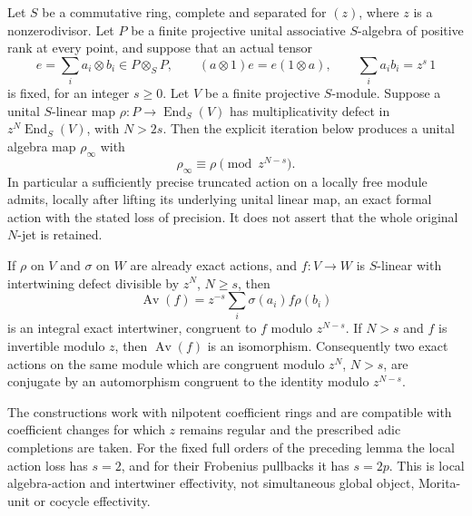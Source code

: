 \begin{proposition}
\label{D:scaled-separable-action-Newton}
Let $S$ be a commutative ring, complete and separated for $(z)$,
where $z$ is a nonzerodivisor. Let $P$ be a finite projective
unital associative $S$-algebra of positive rank at every point,
and suppose that an actual tensor
\[
 e=\sum_i a_i\otimes b_i\in P\otimes_S P,
 \qquad (a\otimes1)e=e(1\otimes a),\qquad
                       \sum_i a_i b_i=z^s\,1            \tag{D.SN.7}
\]
is fixed, for an integer $s\ge0$. Let $V$ be a finite projective
$S$-module. Suppose a unital $S$-linear map
$\rho:P\to\operatorname{End}_S(V)$ has multiplicativity defect
in $z^N\operatorname{End}_S(V)$, with $N>2s$.
Then the explicit iteration below produces a unital algebra
map $\rho_\infty$ with
\[
                \rho_\infty\equiv\rho\pmod {z^{N-s}}.
                                                        \tag{D.SN.8}
\]
In particular a sufficiently precise truncated action on a
locally free module admits, locally after lifting its underlying
unital linear map, an exact formal action with the stated loss
of precision. It does not assert that the whole original
$N$-jet is retained.

If $\rho$ on $V$ and $\sigma$ on $W$ are already exact actions,
and $f:V\to W$ is $S$-linear with intertwining defect divisible
by $z^N$, $N\ge s$, then
\[
 \operatorname{Av}(f)=z^{-s}\sum_i\sigma(a_i)f\rho(b_i)
                                                        \tag{D.SN.9}
\]
is an integral exact intertwiner, congruent to $f$ modulo
$z^{N-s}$. If $N>s$ and $f$ is invertible modulo $z$, then
$\operatorname{Av}(f)$ is an isomorphism. Consequently two
exact actions on the same module which are congruent modulo
$z^N$, $N>s$, are conjugate by an automorphism congruent to the
identity modulo $z^{N-s}$.

The constructions work with nilpotent coefficient rings and
are compatible with coefficient changes for which $z$ remains
regular and the prescribed adic completions are taken. For
the fixed full orders of the preceding lemma the local action
loss has $s=2$, and for their Frobenius pullbacks it has $s=2p$.
This is local algebra-action and intertwiner effectivity, not
simultaneous global object, Morita-unit or cocycle effectivity.
\end{proposition}

